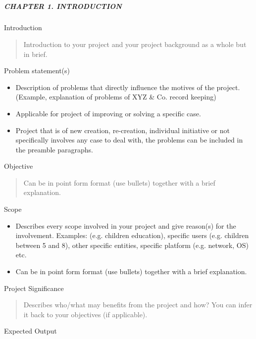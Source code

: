 \subsection{}\label{section}

\subparagraph{CHAPTER 1. INTRODUCTION}\label{chapter-1.-introduction}

Introduction

\begin{quote}
Introduction to your project and your project background as a whole but
in brief.
\end{quote}

Problem statement(s)

\begin{itemize}
\item
  Description of problems that directly influence the motives of the
  project. (Example, explanation of problems of XYZ \& Co. record
  keeping)
\item
  Applicable for project of improving or solving a specific case.
\item
  Project that is of new creation, re-creation, individual initiative or
  not specifically involves any case to deal with, the problems can be
  included in the preamble paragraphs.
\end{itemize}

Objective

\begin{quote}
Can be in point form format (use bullets) together with a brief
explanation.
\end{quote}

Scope

\begin{itemize}
\item
  Describes every scope involved in your project and give reason(s) for
  the involvement. Examples: (e.g. children education), specific users
  (e.g. children between 5 and 8), other specific entities, specific
  platform (e.g. network, OS) etc.
\item
  Can be in point form format (use bullets) together with a brief
  explanation.
\end{itemize}

Project Significance

\begin{quote}
Describes who/what may benefits from the project and how? You can infer
it back to your objectives (if applicable).
\end{quote}

Expected Output


